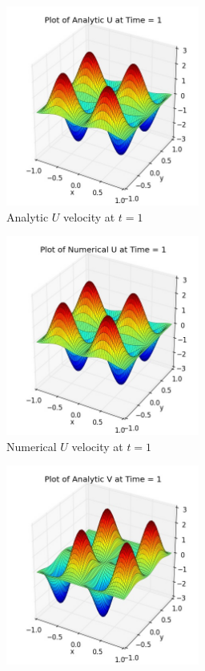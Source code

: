 \begin{figure}[H]
	\centering
	\begin{subfigure}[t]{2.5in}
		\centering
		\includegraphics[width=2.5in]{figures/Pm1a_pf2_U_exact_t_1_grid_60 - Copy.jpg}
		\caption{Analytic $U$ velocity at $t=1$}\label{fig:6.1a}		
	\end{subfigure}
	\quad
	\begin{subfigure}[t]{2.5in}
		\centering
		\includegraphics[width=2.5in]{figures/Pm1a_pf2_uf_t_1_grid_60 - Copy.jpg}
		\caption{Numerical $U$ velocity at $t=1$}\label{fig:6.1b}
	\end{subfigure}
	\quad
	\begin{subfigure}[t]{2.5in}
		\centering
		\includegraphics[width=2.5in]{figures/Pm1a_pf2_V_exact_t_1_grid_60 - Copy.jpg}

\end{subfigure}
\end{figure}
